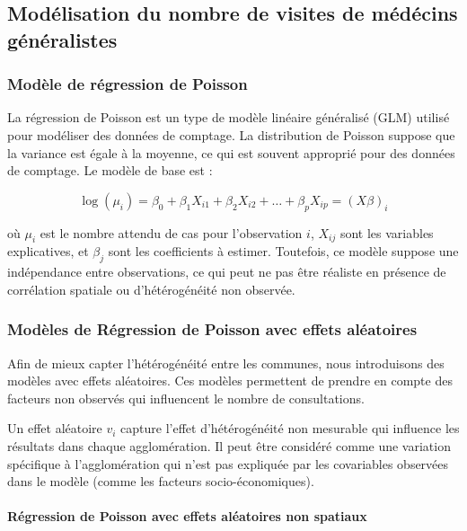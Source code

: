 \documentclass[
]{article}
\begin{document}
\subsection{Modélisation du nombre de visites de médécins
généralistes}\label{moduxe9lisation-du-nombre-de-visites-de-muxe9duxe9cins-guxe9nuxe9ralistes}

\subsubsection{Modèle de régression de
Poisson}\label{moduxe8le-de-ruxe9gression-de-poisson}

La régression de Poisson est un type de modèle linéaire généralisé (GLM)
utilisé pour modéliser des données de comptage. La distribution de
Poisson suppose que la variance est égale à la moyenne, ce qui est
souvent approprié pour des données de comptage. Le modèle de base est :

\[
\log(\mu_i) = \beta_0 + \beta_1 X_{i1} + \beta_2 X_{i2} + \dots + \beta_p X_{ip} = (X\beta)_i
\]

où \(\mu_i\) est le nombre attendu de cas pour l'observation \(i\),
\(X_{ij}\) sont les variables explicatives, et \(\beta_j\) sont les
coefficients à estimer. Toutefois, ce modèle suppose une indépendance
entre observations, ce qui peut ne pas être réaliste en présence de
corrélation spatiale ou d'hétérogénéité non observée.

\subsubsection{Modèles de Régression de Poisson avec effets
aléatoires}\label{moduxe8les-de-ruxe9gression-de-poisson-avec-effets-aluxe9atoires}

Afin de mieux capter l'hétérogénéité entre les communes, nous
introduisons des modèles avec effets aléatoires. Ces modèles permettent
de prendre en compte des facteurs non observés qui influencent le nombre
de consultations.

Un effet aléatoire \(v_i\) capture l'effet d'hétérogénéité non mesurable
qui influence les résultats dans chaque agglomération. Il peut être
considéré comme une variation spécifique à l'agglomération qui n'est pas
expliquée par les covariables observées dans le modèle (comme les
facteurs socio-économiques).

\paragraph{Régression de Poisson avec effets aléatoires non
spatiaux}\label{ruxe9gression-de-poisson-avec-effets-aluxe9atoires-non-spatiaux}
\end{document}
